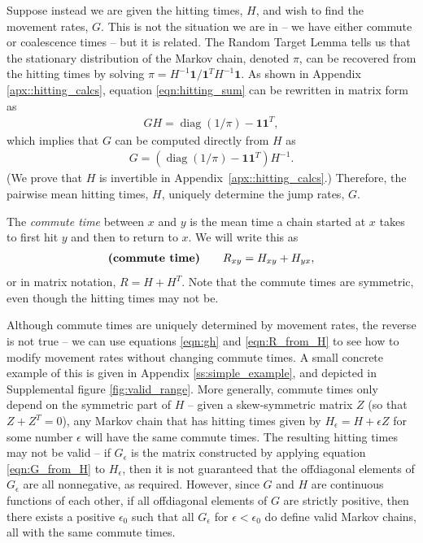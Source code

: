 \documentclass{article}
\DeclareMathOperator{\diag}{\mathop{\mbox{diag}}}
\newcommand{\bone}{\mathbf{1}}
\begin{document}
Suppose instead we are given the hitting times, $H$, and wish to find the movement rates, $G$.
This is not the situation we are in -- we have either commute or coalescence times --
but it is related.
The Random Target Lemma \citep{aldous-fill-2014}
tells us that the stationary distribution of the Markov chain, denoted $\pi$,
can be recovered from the hitting times by solving $\pi = H^{-1} \bone / \bone^T H^{-1} \bone$.
As shown in Appendix \ref{apx::hitting_calcs},
equation \eqref{eqn:hitting_sum} can be rewritten in matrix form as
\begin{align} \label{eqn:gh}
    G H = \diag(1/\pi) - \bone \bone^T ,
\end{align}
which implies that $G$ can be computed directly from $H$ as
\begin{align} \label{eqn:G_from_H}
    G = \left( \diag(1/\pi) - \bone \bone^T \right) H^{-1} .
\end{align}
(We prove that $H$ is invertible in Appendix~\ref{apx::hitting_calcs}.) 
Therefore, the pairwise mean hitting times, $H$, uniquely determine the jump rates, $G$.

The \emph{commute time} between $x$ and $y$ is the mean time a chain started at $x$ takes 
to first hit $y$ and then to return to $x$.
We will write this as
\begin{align} \label{eqn:R_from_H}
\text{\bf (commute time)} \qquad
    R_{xy} = H_{xy} + H_{yx},
\end{align}
or in matrix notation, $R = H + H^T$.
Note that the commute times are symmetric,
even though the hitting times may not be.

Although commute times are uniquely determined by movement rates, the reverse is not true --
we can use equations \eqref{eqn:gh} and \eqref{eqn:R_from_H} to see how to modify movement rates
without changing commute times.  
A small concrete example of this is given in Appendix \ref{ss:simple_example},
and depicted in Supplemental figure \ref{fig:valid_range}.
More generally, commute times only depend on the symmetric part of $H$ --
given a skew-symmetric matrix $Z$ (so that $Z + Z^T = 0$),
any Markov chain that has hitting times given by $H_\epsilon = H + \epsilon Z$ for some number $\epsilon$
will have the same commute times.
The resulting hitting times may not be valid --
if $G_\epsilon$ is the matrix constructed by applying equation \eqref{eqn:G_from_H} to $H_\epsilon$,
then it is not guaranteed that the offdiagonal elements of $G_\epsilon$ are all nonnegative, as required.
However, since $G$ and $H$ are continuous functions of each other,
if all offdiagonal elements of $G$ are strictly positive,
then there exists a positive $\epsilon_0$ such that all $G_\epsilon$ for $\epsilon < \epsilon_0$
do define valid Markov chains, all with the same commute times.
\end{document}
